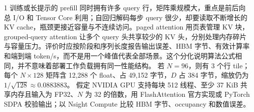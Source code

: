 \begin{solutionexercise}{1}
训练或长提示的 prefill 同时拥有许多 query 行，矩阵乘规模大，重点是前后向总 I/O 和 Tensor Core 利用；自回归解码每步 query 很少，却要读取不断增长的 KV cache，瓶颈更接近容量与不连续访问。paged attention 用页表管理 KV 块，grouped-query attention 让多个 query 头共享较少的 KV 头，分别处理内存碎片与容量压力。评价时应按阶段和序列长度报告输出误差、HBM 字节、有效计算率和端到端 token/s，而不是用一个峰值代表全部场景。这个分化说明算法公式相同，并不意味着部署工作负载拥有同一性能结构。
\variantheading 若 $N=96$，则有 3 个行 tile；每个 $N\times128$ 矩阵含 12,288 个 float、占 49,152 字节，$D$ 占 384 字节，缩放仍为 $1/\sqrt{128}\approx0.0883883$。
\practiceheading 假定 NVIDIA GPU 支持每块 512 线程、至少 37 KiB 共享内存且输入为 FP32、$N$ 为 32 的倍数，用 FlashAttention 官方实现或 PyTorch SDPA 校验输出；以 Nsight Compute 比较 HBM 字节、occupancy 和数值误差。
\end{solutionexercise}

